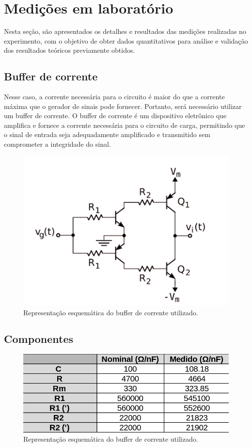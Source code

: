 \section{Medições em laboratório}

Nesta seção, são apresentados os detalhes e resultados das medições realizadas no experimento, com o objetivo de obter dados quantitativos para análise e validação dos resultados teóricos previamente obtidos.

\subsection{Buffer de corrente}

Nesse caso, a corrente necessária para o circuito é maior do que a corrente máxima que o gerador de sinais pode fornecer. Portanto, será necessário utilizar um buffer de corrente. O buffer de corrente é um dispositivo eletrônico que amplifica e fornece a corrente necessária para o circuito de carga, permitindo que o sinal de entrada seja adequadamente amplificado e transmitido sem comprometer a integridade do sinal.

\begin{figure}[h]
    \centering
    \includegraphics[width=0.7\columnwidth]{images/buffer_corrente.png}
    \caption{Representação esquemática do buffer de corrente utilizado.}
\end{figure}

\subsection{Componentes}

\begin{figure}[h]
    \centering
    \includegraphics[width=0.7\columnwidth]{images/componentes_reais.png}
    \caption{Representação esquemática do buffer de corrente utilizado.}
\end{figure}

